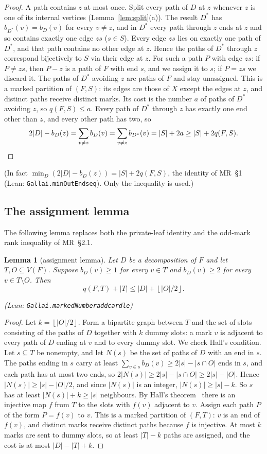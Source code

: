 \documentclass[11pt]{amsart}
\newtheorem{lemma}[theorem]{Lemma}
\theoremstyle{definition}
\theoremstyle{remark}
\renewcommand{\_}{\oldunderscore\allowbreak}
\newcommand{\lean}[1]{\textup{(Lean: {\small\texttt{#1}})}}
\newcommand{\leanst}[1]{\par{\raggedright\small\textup{(Lean: \texttt{#1})}\par}}
\newcommand{\fl}[1]{\left\lfloor #1\right\rfloor}
\begin{document}
\begin{proof}
A path contains $z$ at most once. Split every path of $D$ at $z$ whenever $z$ is one of its internal
vertices (Lemma~\ref{lem:split}(a)). The result $D^*$ has $b_{D^*}(v)=b_D(v)$ for every $v\ne z$, and
in $D^*$ every path through $z$ ends at $z$ and so contains exactly one edge $zs$ ($s\in S$). Every
edge $zs$ lies on exactly one path of $D^*$, and that path contains no other edge at $z$. Hence the
paths of $D^*$ through $z$ correspond bijectively to $S$ via their edge at $z$. For such a path $P$
with edge $zs$: if $P\ne zs$, then $P-z$ is a path of $F$ with end $s$, and we assign it to $s$; if
$P=zs$ we discard it. The paths of $D^*$ avoiding $z$ are paths of $F$ and stay unassigned. This is
a marked partition of $(F,S)$: its edges are those of $X$ except the edges at $z$, and distinct paths
receive distinct marks. Its cost is the number $a$ of paths of $D^*$ avoiding $z$, so $q(F,S)\le a$.
Every path of $D^*$ through $z$ has exactly one end other than $z$, and every other path has two, so
\[
2|D|-b_D(z)=\sum_{v\ne z}b_D(v)=\sum_{v\ne z}b_{D^*}(v)=|S|+2a\ge|S|+2q(F,S).\qedhere
\]
\end{proof}

(In fact $\min_D(2|D|-b_D(z))=|S|+2q(F,S)$, the identity of MR~\S1 \lean{Gallai.minOutEnds\_eq}.
Only the inequality is used.)

\subsection{The assignment lemma}
The following lemma replaces both the private-leaf identity and the odd-mark rank inequality of
MR~\S2.1.

\begin{lemma}[assignment lemma]\label{lem:hall}
Let $D$ be a decomposition of $F$ and let $T,O\subseteq V(F)$. Suppose $b_D(v)\ge1$ for every
$v\in T$ and $b_D(v)\ge2$ for every $v\in T\setminus O$. Then
\[
q(F,T)+|T|\le|D|+\fl{|O|/2}.
\]
\leanst{Gallai.markedNumber\_add\_card\_le}
\end{lemma}

\begin{proof}
Let $k=\fl{|O|/2}$. Form a bipartite graph between $T$ and the set of slots consisting of the paths
of $D$ together with $k$ dummy slots: a mark $v$ is adjacent to every path of $D$ ending at $v$ and to
every dummy slot. We check Hall's condition. Let $s\subseteq T$ be nonempty, and let $N(s)$ be the
set of paths of $D$ with an end in $s$. The paths ending in $s$ carry at least
$\sum_{v\in s}b_D(v)\ge 2|s|-|s\cap O|$ ends in $s$, and each path has at most two ends, so
$2|N(s)|\ge 2|s|-|s\cap O|\ge 2|s|-|O|$. Hence $|N(s)|\ge|s|-|O|/2$, and since $|N(s)|$ is an
integer, $|N(s)|\ge|s|-k$. So $s$ has at least $|N(s)|+k\ge|s|$ neighbours. By Hall's theorem~\cite{Hall35} there
is an injective map $f$ from $T$ to the slots with $f(v)$ adjacent to $v$. Assign each path $P$ of
the form $P=f(v)$ to $v$. This is a marked partition of $(F,T)$: $v$ is an end of $f(v)$, and
distinct marks receive distinct paths because $f$ is injective. At most $k$ marks are sent to dummy
slots, so at least $|T|-k$ paths are assigned, and the cost is at most $|D|-|T|+k$.
\end{proof}
\end{document}
